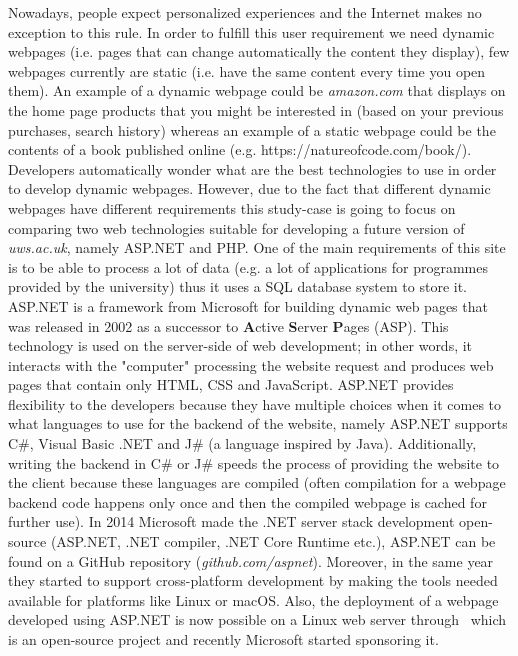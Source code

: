 \documentclass[11]{article}
\begin{document}
	Nowadays, people expect personalized experiences and the Internet makes no exception to this rule. In order to fulfill this user requirement we need dynamic webpages (i.e. pages that can change automatically the content they display), few webpages currently are static (i.e. have the same content every time you open them). An example of a dynamic webpage could be \textit{amazon.com} that displays on the home page products that you might be interested in (based on your previous purchases, search history) whereas an example of a static webpage could be the contents of a book published online (e.g. https://natureofcode.com/book/). Developers automatically wonder what are the best technologies to use in order to develop dynamic webpages. However, due to the fact that different dynamic webpages have different requirements this study-case is going to focus on comparing two web technologies suitable for developing a future version of \textit{uws.ac.uk}, namely ASP.NET and PHP. One of the main requirements of this site is to be able to process a lot of data (e.g. a lot of applications for programmes provided by the university) thus it uses a SQL database system to store it. \\ 
	
	ASP.NET is a framework from Microsoft for building dynamic web pages that was released in 2002 as a successor to \textbf{A}ctive \textbf{S}erver \textbf{P}ages (ASP).  This technology is used on the server-side of web development; in other words, it interacts with the "computer" processing the website request and produces web pages that contain only HTML, CSS and JavaScript. ASP.NET provides flexibility to the developers because they have multiple choices when it comes to what languages to use for the backend of the website, namely ASP.NET supports C\#, Visual Basic .NET and J\# (a language inspired by Java). Additionally, writing the backend in C\# or J\# speeds the process of providing the website to the client because these languages are compiled (often compilation for a webpage backend code happens only once and then the compiled webpage is cached for further use). In 2014 Microsoft made the .NET server stack development open-source (ASP.NET, .NET compiler, .NET Core Runtime etc.), ASP.NET can be found on a GitHub repository (\textit{github.com/aspnet}). Moreover, in the same year they started to support cross-platform development by making the tools needed available for platforms like Linux or macOS. Also, the deployment of a webpage developed using ASP.NET is now possible on a Linux web server  through~\cite{Mono} which is an open-source project and recently Microsoft started sponsoring it.\\
\end{document}
